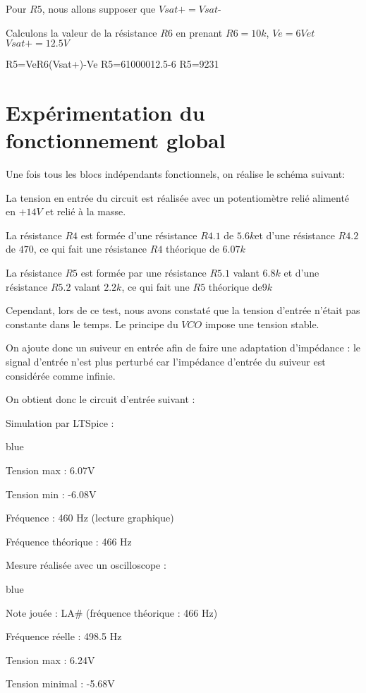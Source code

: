 {Pour $R5$, nous allons supposer que $Vsat+=Vsat$-

Calculons la valeur de la résistance $R6$ en prenant $R6=10k$, $Ve=6Vet$ $Vsat+=12.5V$

R5=VeR6(Vsat+)-Ve
R5=61000012.5-6
R5=9231

\section{Expérimentation du fonctionnement global}

Une fois tous les blocs indépendants fonctionnels, on réalise le schéma suivant:



La tension en entrée du circuit est réalisée avec un potentiomètre relié alimenté en $+14V$ et relié à la masse.

La résistance $R4$ est formée d’une résistance $R4.1$ de $5.6k$et d’une résistance $R4.2$ de $470$, ce qui fait une résistance $R4$ théorique de $6.07k$

La résistance $R5$ est formée par une résistance $R5.1$ valant $6.8k$ et d’une résistance $R5.2$ valant $2.2k$, ce qui fait une $R5$ théorique de$9k$

Cependant, lors de ce test, nous avons constaté que la tension d’entrée n’était pas constante dans le temps. Le principe du $VCO$ impose une tension stable.

On ajoute donc un suiveur en entrée afin de faire une adaptation d’impédance : le signal d’entrée n’est plus perturbé car l’impédance d’entrée du suiveur est considérée comme infinie.









On obtient donc le circuit d’entrée suivant :




Simulation par LTSpice :


\begin{items}{blue}{\Bullet}
\item Tension max : 6.07V
\item Tension min : -6.08V
\item Fréquence : 460 Hz (lecture graphique)
\item Fréquence théorique : 466 Hz
\end{items}

Mesure réalisée avec un oscilloscope :


\begin{items}{blue}{\Bullet}
\item Note jouée : LA\# (fréquence théorique : 466 Hz)
\item Fréquence réelle : 498.5 Hz
\item Tension max : 6.24V
\item Tension minimal : -5.68V
\end{items}

}
